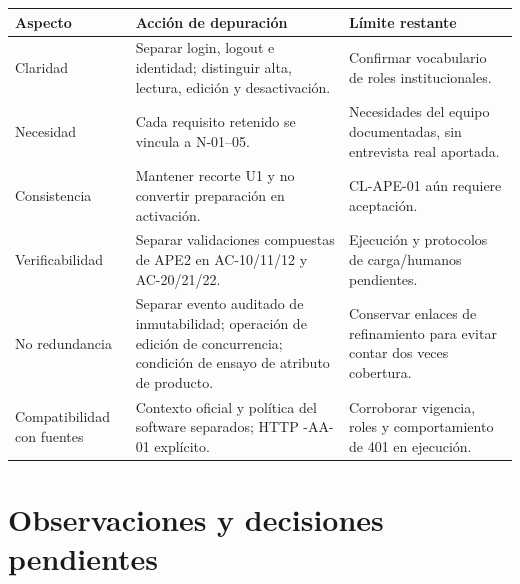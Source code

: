 \documentclass[12pt,a4paper]{report}
\begin{document}
{\def\LTcaptype{none} %
\begin{longtable}[]{@{}
  >{\raggedright\arraybackslash}p{}
  >{\raggedright\arraybackslash}p{}
  >{\raggedright\arraybackslash}p{}@{}}
\toprule\noalign{}
\begin{minipage}[b]{\linewidth}\raggedright
Aspecto
\end{minipage} & \begin{minipage}[b]{\linewidth}\raggedright
Acción de depuración
\end{minipage} & \begin{minipage}[b]{\linewidth}\raggedright
Límite restante
\end{minipage} \\
\midrule\noalign{}
\endhead
\bottomrule\noalign{}
\endlastfoot
Claridad & Separar login, logout e identidad; distinguir alta, lectura,
edición y desactivación. & Confirmar vocabulario de roles
institucionales. \\
Necesidad & Cada requisito retenido se vincula a N-01--05. &
Necesidades del equipo documentadas, sin entrevista real aportada. \\
Consistencia & Mantener recorte U1 y no convertir preparación en
activación. & CL-APE-01 aún requiere aceptación. \\
Verificabilidad & Separar validaciones compuestas de APE2 en
AC-10/11/12 y AC-20/21/22. & Ejecución y protocolos de
carga/humanos pendientes. \\
No redundancia & Separar evento auditado de inmutabilidad; operación de
edición de concurrencia; condición de ensayo de atributo de producto. &
Conservar enlaces de refinamiento para evitar contar dos veces
cobertura. \\
Compatibilidad con fuentes & Contexto oficial y política del software
separados; HTTP -AA-01 explícito. & Corroborar vigencia, roles y
comportamiento de 401 en ejecución. \\
\end{longtable}
}

\section{Observaciones y decisiones
pendientes}\label{dossier-observaciones-y-decisiones-pendientes}
\end{document}
